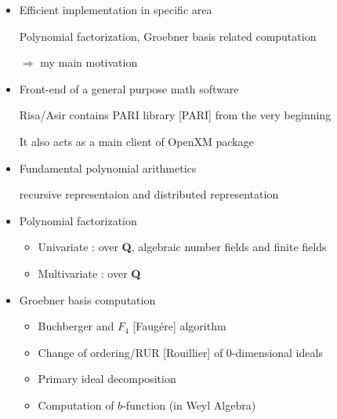 \begin{slide}{}

\begin{itemize}
\item Efficient implementation in specific area

Polynomial factorization, Groebner basis related computation

$\Rightarrow$ my main motivation

\item Front-end of a general purpose math software

Risa/Asir contains PARI library [PARI] from the very beginning

It also acts as a main client of OpenXM package

\end{itemize}
\end{slide}

\begin{slide}{}

\begin{itemize}
\item Fundamental polynomial arithmetics

recursive representaion and distributed representation

\item Polynomial factorization

\begin{itemize}
\item Univariate : over {\bf Q}, algebraic number fields and finite fields

\item Multivariate : over {\bf Q}
\end{itemize}

\item Groebner basis computation

\begin{itemize}
\item Buchberger and $F_4$ [Faug\'ere] algorithm

\item Change of ordering/RUR [Rouillier] of 0-dimensional ideals

\item Primary ideal decomposition

\item Computation of $b$-function (in Weyl Algebra)
\end{itemize}
\end{itemize}
\end{slide}

